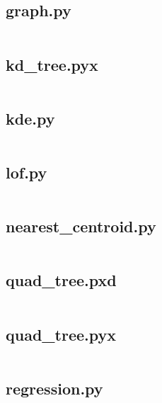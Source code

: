 \documentclass{article}
\begin{document}
\subsection{graph.py}
\inputminted{python}{/home/dufferzafar/dev/@clones/scikit-learn/sklearn/neighbors/graph.py}
\newpage

\subsection{kd\_tree.pyx}
\inputminted{cython}{/home/dufferzafar/dev/@clones/scikit-learn/sklearn/neighbors/kd_tree.pyx}
\newpage

\subsection{kde.py}
\inputminted{python}{/home/dufferzafar/dev/@clones/scikit-learn/sklearn/neighbors/kde.py}
\newpage

\subsection{lof.py}
\inputminted{python}{/home/dufferzafar/dev/@clones/scikit-learn/sklearn/neighbors/lof.py}
\newpage

\subsection{nearest\_centroid.py}
\inputminted{python}{/home/dufferzafar/dev/@clones/scikit-learn/sklearn/neighbors/nearest_centroid.py}
\newpage

\subsection{quad\_tree.pxd}
\inputminted{cython}{/home/dufferzafar/dev/@clones/scikit-learn/sklearn/neighbors/quad_tree.pxd}
\newpage

\subsection{quad\_tree.pyx}
\inputminted{cython}{/home/dufferzafar/dev/@clones/scikit-learn/sklearn/neighbors/quad_tree.pyx}
\newpage

\subsection{regression.py}
\inputminted{python}{/home/dufferzafar/dev/@clones/scikit-learn/sklearn/neighbors/regression.py}
\newpage
\end{document}

